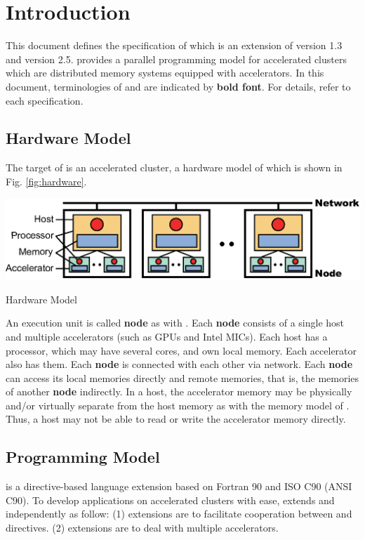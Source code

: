 \chapter{Introduction}\label{chap:intro}
\setcounter{page}{1}
This document defines the specification of {\XACC} which is an extension of {\XMP} version 1.3\cite{xmp} and {\OACC} version 2.5\cite{openacc}.
{\XACC} provides a parallel programming model for accelerated clusters
which are distributed memory systems equipped with accelerators.
In this document,
terminologies of {\XMP} and {\OACC} are indicated by {\bf bold font}.
For details, refer to each specification\cite{xmp,openacc}.

\section{Hardware Model}
The target of {\XACC} is an accelerated cluster,
a hardware model of which is shown in Fig. \ref{fig:hardware}.

\begin{myfigure}
  \includegraphics[scale=0.9,clip]{figs/hardware.eps}
  \caption{Hardware Model}\label{fig:hardware}
\end{myfigure}

An execution unit is called {\bf node} as with {\XMP}.
Each {\bf node} consists of a single host and multiple accelerators (such as GPUs and Intel MICs).
Each host has a processor, which may have several cores, and own local memory.
Each accelerator also has them.
Each {\bf node} is connected with each other via network.
Each {\bf node} can access its local memories directly and remote memories,
that is, the memories of another {\bf node} indirectly.
In a host,
the accelerator memory may be physically and/or virtually separate from the host memory as with the memory model of {\OACC}.
Thus,
a host may not be able to read or write the accelerator memory directly.

\section{Programming Model}
{\XACC} is a directive-based language extension based on Fortran 90 and ISO C90 (ANSI C90).
To develop applications on accelerated clusters with ease,
{\XACC} extends {\XACC} and {\OACC} independently as follow:
(1) {\XMP} extensions are to facilitate cooperation between {\XMP} and {\OACC} directives.
(2) {\OACC} extensions are to deal with multiple accelerators.

